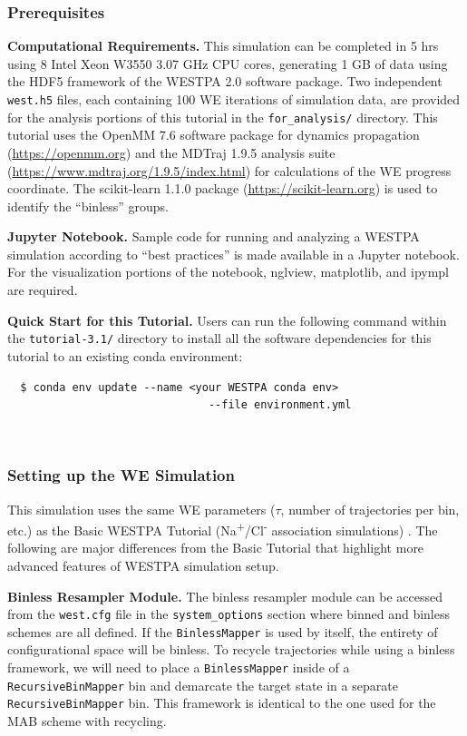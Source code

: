 \subsubsection{Prerequisites}

\textbf{Computational Requirements.} This simulation can be completed in 5 hrs using 8 Intel Xeon W3550 3.07 GHz CPU cores, generating 1 GB of data using the HDF5 framework of the WESTPA 2.0 software package. 
Two independent \verb|west.h5| files, each containing 100 WE iterations of simulation data, are provided for the analysis portions of this tutorial in the \verb|for_analysis/| directory.
This tutorial uses the OpenMM 7.6 software package for dynamics propagation ({\url{https://openmm.org}}) and the MDTraj 1.9.5 analysis suite ({\url{https://www.mdtraj.org/1.9.5/index.html}}) for calculations of the WE progress coordinate. 
The scikit-learn 1.1.0 package ({\url{https://scikit-learn.org}}) is used to identify the “binless” groups.

\textbf{Jupyter Notebook.} Sample code for running and analyzing a WESTPA simulation according to “best practices” is made available in a Jupyter notebook.
For the visualization portions of the notebook, nglview, matplotlib, and ipympl are required. 

\textbf{Quick Start for this Tutorial.} Users can run the following command within the \verb|tutorial-3.1/| directory to install all the software dependencies for this tutorial to an existing conda environment:
\begin{verbatim}
  $ conda env update --name <your WESTPA conda env> 
                               --file environment.yml
\end{verbatim}
~~

\subsubsection{Setting up the WE Simulation}
This simulation uses the same WE parameters ($\tau$, number of trajectories per bin, etc.) as the Basic WESTPA Tutorial (Na\textsuperscript{+}/Cl\textsuperscript{-} association simulations) \citep{bogetti_suite_2019}. 
The following are major differences from the Basic Tutorial that highlight more advanced features of WESTPA simulation setup.

\textbf{Binless Resampler Module.} The binless resampler module can be accessed from the \verb|west.cfg| file in the \verb|system_options| section where binned and binless schemes are all defined. 
If the \verb|BinlessMapper| is used by itself, the entirety of configurational space will be binless. 
To recycle trajectories while using a binless framework, we will need to place a \verb|BinlessMapper| inside of a \verb|RecursiveBinMapper| bin and demarcate the target state in a separate \verb|RecursiveBinMapper| bin. 
This framework is identical to the one used for the MAB scheme with recycling.

